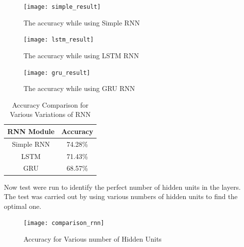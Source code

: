 \begin{figure}[H]
	\begin{center}
		
		\texttt{[image: simple\_result]}
		\caption{The accuracy while using Simple RNN}
	\end{center}
\end{figure}
\begin{figure}[H]
	\begin{center}
		
		\texttt{[image: lstm\_result]}
		\caption{The accuracy while using LSTM RNN}
	\end{center}
\end{figure}

\begin{figure}[H]
	\begin{center}
		
		\texttt{[image: gru\_result]}
		\caption{The accuracy while using GRU RNN}
	\end{center}
\end{figure}

\begin{center}
	\begin {table}[h]
	\begin{center}
		
		\begin{tabular}{ |c|c| } 
			\hline
			\textbf{RNN Module} & \textbf{Accuracy}  \\ 
			\hline
			Simple RNN & 74.28\%  \\ 
			\hline
			LSTM & 71.43\%  \\ 
			\hline
			GRU & 68.57\%  \\ 
			\hline			
		\end{tabular}
		\caption{Accuracy Comparison for Various Variations of RNN}
	\end{center}
\end{table}
\end{center}

Now test were run to identify the perfect number of hidden units in the layers. The test was carried out by using various numbers of hidden units to find the optimal one.

\begin{figure}[H]
	\begin{center}
		
		\texttt{[image: comparison\_rnn]}
		\caption{Accuracy for Various number of Hidden Units}
	\end{center}
\end{figure}





